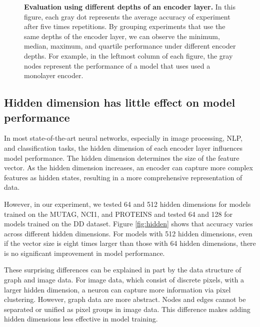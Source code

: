 \begin{figure}[htbp]
\vspace{0.5cm}
\caption[Evaluation using different depths of an encoder layer]{\textbf{Evaluation using different depths of an encoder layer.} In this figure, each gray dot represents the average accuracy of experiment after five times repetitions. By grouping experiments that use the same depths of the encoder layer, we can observe the minimum, median, maximum, and quartile performance under different encoder depths. For example, in the leftmost column of each figure, the gray nodes represent the performance of a model that uses used a monolayer encoder.}\label{fig:deeper}
\end{figure}




\subsection{Hidden dimension has little effect on model performance}



In most state-of-the-art neural networks, especially in image processing, NLP, and classification tasks, the hidden dimension of each encoder layer influences model performance. The hidden dimension determines the size of the feature vector. As the hidden dimension increases, an encoder can capture more complex features as hidden states, resulting in a more comprehensive representation of data.

However, in our experiment, we tested 64 and 512 hidden dimensions for models trained on the MUTAG, NCI1, and PROTEINS and tested 64 and 128 for models trained on the DD dataset. Figure \ref{fig:hidden} shows that accuracy varies across different hidden dimensions. For models with 512 hidden dimensions, even if the vector size is eight times larger than those with 64 hidden dimensions, there is no significant improvement in model performance. 


These surprising differences can be explained in part by the data structure of graph and image data. For image data, which consist of discrete pixels, with a larger hidden dimension, a neuron can capture more information via pixel clustering. However, graph data are more abstract. Nodes and edges cannot be separated or unified as pixel groups in image data. This difference makes adding hidden dimensions less effective in model training. 

